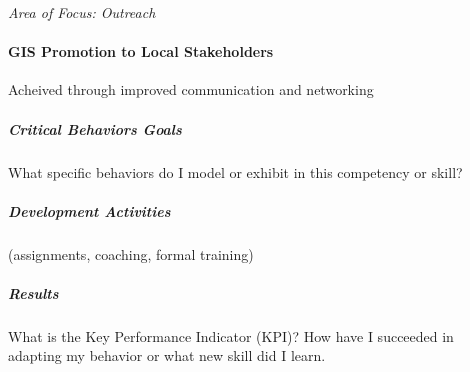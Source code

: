 \textit{Area of Focus: Outreach}
\paragraph{GIS Promotion to Local Stakeholders}

Acheived through improved communication and networking

\subparagraph{Critical Behaviors Goals}

What specific behaviors do I model or exhibit in this competency or skill?
\vspace{.3in}

\subparagraph{Development Activities}

(assignments, coaching, formal training)
\vspace{.3in}

\subparagraph{Results}

What is the Key Performance Indicator (KPI)? How have I succeeded in adapting my behavior or what new skill did I learn.


